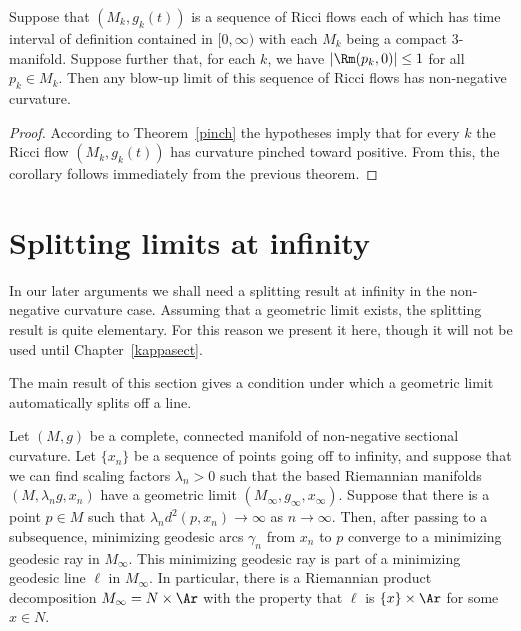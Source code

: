 \begin{corollary}\label{cor:blow-up-limit-nonnegative-curvature-pinched}
\notready

Suppose that $(M_k,g_k(t))$ is a sequence of Ricci flows each of which has time
interval of definition contained in $[0,\infty)$ with each $M_k$ being a
compact $3$-manifold. Suppose further that, for each $k$, we have $|\Rm(p_k,0)|\le 1$ for all $p_k\in M_k$. Then any blow-up limit of this sequence
of Ricci flows has non-negative curvature.
\end{corollary}


\begin{proof}
\sketch
{}
According to Theorem~\ref{pinch} the hypotheses imply that for every $k$ the
Ricci flow $(M_k,g_k(t))$ has curvature pinched toward positive. From this, the
corollary follows immediately from the previous theorem.
\end{proof}

\section{Splitting limits at infinity}

In our later arguments we shall need a splitting result at infinity
in the non-negative curvature case. Assuming that a geometric limit
exists, the splitting result is quite elementary. For this reason we
present it here, though it will not be used until
Chapter~\ref{kappasect}.



The main result of this section gives a condition under which a geometric limit
automatically splits off a line.

\begin{theorem}\label{thm:splitting-at-infinity}
\notready
\label{topsplit}

Let $(M,g)$ be a complete, connected manifold of non-negative
sectional curvature. Let $\{x_n\}$ be a sequence of points going off
to infinity, and suppose that we can find scaling factors
$\lambda_n>0$ such that the based Riemannian manifolds
$(M,\lambda_ng,x_n)$ have a geometric limit
$(M_\infty,g_\infty,x_\infty)$. Suppose that there is a point $p\in
M$ such that $\lambda_nd^2(p,x_n)\rightarrow \infty$ as
$n\rightarrow\infty$.  Then, after passing to a subsequence,
minimizing geodesic arcs $\gamma_n$ from $x_n$ to $p$ converge to a
minimizing geodesic ray in $M_\infty$. This minimizing geodesic ray
is part of a minimizing geodesic line $\ell$ in $M_\infty$. In
particular, there is a Riemannian product decomposition
$M_\infty=N\times \Ar$ with the property that $\ell$ is $\{x\}\times
\Ar$ for some $x\in N$.
\end{theorem}


